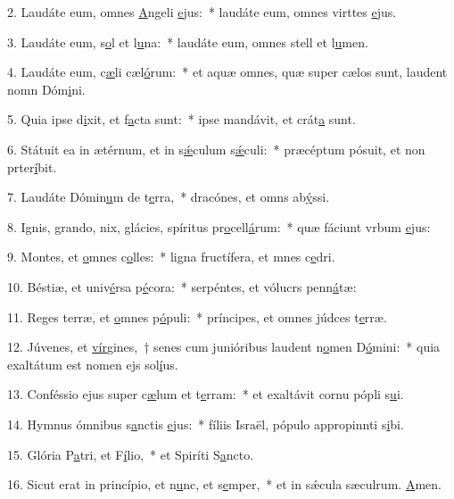2. Laudáte eum, omnes \uline{A}ngeli \uline{e}jus:~* laudáte eum, omnes virttes \uline{e}jus.\par 
3. Laudáte eum, s\uline{o}l et l\uline{u}na:~* laudáte eum, omnes stell et l\uline{u}men.\par 
4. Laudáte eum, c\uline{æ}li cæl\uline{ó}rum:~* et aquæ omnes, quæ super cælos sunt, laudent nomn Dóm\uline{i}ni.\par 
5. Quia ipse d\uline{i}xit, et f\uline{a}cta sunt:~* ipse mandávit, et crát\uline{a} sunt.\par 
6. Státuit ea in ætérnum, et in s\uline{ǽ}culum s\uline{ǽ}culi:~* præcéptum pósuit, et non prter\uline{í}bit.\par 
7. Laudáte Dómin\uline{u}m de t\uline{e}rra,~* dracónes, et omns ab\uline{ý}ssi.\par 
8. Ignis, grando, nix, glácies, spíritus pr\uline{o}cell\uline{á}rum:~* quæ fáciunt vrbum \uline{e}jus:\par 
9. Montes, et \uline{o}mnes c\uline{o}lles:~* ligna fructífera, et mnes c\uline{e}dri.\par 
10. Béstiæ, et univ\uline{é}rsa p\uline{é}cora:~* serpéntes, et vólucrs penn\uline{á}tæ:\par 
11. Reges terræ, et \uline{o}mnes p\uline{ó}puli:~* príncipes, et omnes júdces t\uline{e}rræ.\par 
12. Júvenes, et \uline{vír}gines,~† senes cum junióribus laudent n\uline{o}men D\uline{ó}mini:~* quia exaltátum est nomen ejs sol\uline{í}us.\par 
13. Conféssio ejus super c\uline{æ}lum et t\uline{e}rram:~* et exaltávit cornu pópli s\uline{u}i.\par 
14. Hymnus ómnibus s\uline{a}nctis \uline{e}jus:~* fíliis Israël, pópulo appropinnti s\uline{i}bi.\par 
15. Glória P\uline{a}tri, et F\uline{í}lio,~* et Spiríti S\uline{a}ncto.\par 
16. Sicut erat in princípio, et n\uline{u}nc, et s\uline{e}mper,~* et in sǽcula sæculrum. \uline{A}men.\par 
